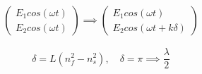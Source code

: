 \documentclass[handout]{beamer}
\begin{document}
\begin{frame}
\begin{columns}
\begin{column}{0.5\textwidth}
            \begin{gather*}
                \begin{pmatrix}
                    E_1 cos(\omega t) \\
                    E_2 cos(\omega t)
                \end{pmatrix}
                \implies
                \begin{pmatrix}
                    E_1 cos(\omega t) \\
                    E_2 cos(\omega t + k\delta)
                \end{pmatrix}
            \end{gather*}
            
            \begin{equation*}
                \delta = L (n_f^2 - n_s^2), \quad \delta = \pi \implies \frac{\lambda}{2}
            \end{equation*}
        \end{column}
      \end{columns}
\end{frame}
\end{document}
